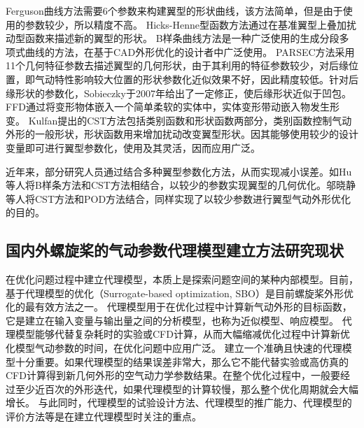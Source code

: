 Ferguson曲线方法需要6个参数来构建翼型的形状曲线，该方法简单\cite{Sun2018}，但是由于使用的参数较少，所以精度不高。
Hicks-Henne型函数方法通过在基准翼型上叠加扰动型函数来描述新的翼型的形状\cite{Zhang2011}。
B样条曲线方法是一种广泛使用的生成分段多项式曲线的方法，在基于CAD外形优化的设计者中广泛使用\cite{Xu2014, Martn2014}。
PARSEC方法采用11个几何特征参数去描述翼型的几何形状，由于其利用的特征参数较少，对后缘位置，即气动特性影响较大位置的形状参数化近似效果不好\cite{Salunke2014}，因此精度较低\cite{Shahrokhi2007, Kharal2012}。针对后缘形状的参数化，Sobieczky\cite{Shahrokhi2007}于2007年给出了一定修正，使后缘形状近似于凹包。
FFD通过将变形物体嵌入一个简单柔软的实体中，实体变形带动嵌入物发生形变\cite{Thomas2012,Leloudas2018, Hu2022Shape}。
Kulfan提出的CST方法包括类别函数和形状函数两部分，类别函数控制气动外形的一般形状，形状函数用来增加扰动改变翼型形状。因其能够使用较少的设计变量即可进行翼型参数化，使用及其灵活，因而应用广泛\cite{Wu2022,Tan2022,Zhang2021}。

近年来，部分研究人员通过结合多种翼型参数化方法，从而实现减小误差。如Hu等人将B样条方法和CST方法相结合，以较少的参数实现翼型的几何优化\cite{Hu2022}。邬晓静等人将CST方法和POD方法结合，同样实现了以较少参数进行翼型气动外形优化的目的\cite{Wu2019}。

\vspace{0.8em}
\subsection{国内外螺旋桨的气动参数代理模型建立方法研究现状}\label{Sec: response model}
\vspace{0.8em}

在优化问题过程中建立代理模型，本质上是探索问题空间的某种内部模型。目前，基于代理模型的优化（Surrogate-based optimization, SBO）\cite{Forrester2009,Queipo2005}是目前螺旋桨外形优化的最有效方法之一。
代理模型用于在优化过程中计算新气动外形的目标函数，它是建立在输入变量与输出量之间的分析模型，也称为近似模型、响应模型。
代理模型能够代替复杂耗时的实验或CFD计算，从而大幅缩减优化过程中计算新优化模型气动参数的时间，在优化问题中应用广泛。
建立一个准确且快速的代理模型十分重要。如果代理模型的结果误差非常大，那么它不能代替实验或高仿真的CFD计算得到新几何外形的空气动力学参数结果。在整个优化过程中，一般要经过至少近百次的外形迭代，如果代理模型的计算较慢，那么整个优化周期就会大幅增长。
与此同时，代理模型的试验设计方法\cite{Queipo2005}、代理模型的推广能力\cite{Fornberg2004,Rippa1999}、代理模型的评价方法\cite{Romero2005}等是在建立代理模型时关注的重点。

